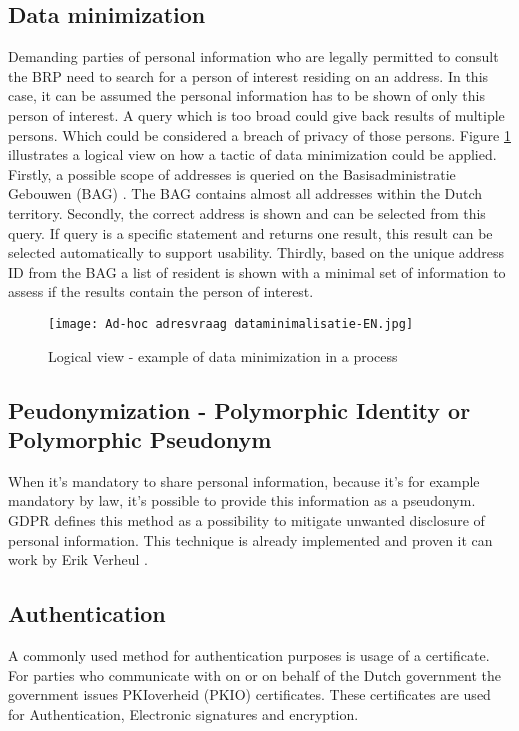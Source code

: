 \subsection{Data minimization}
Demanding parties of personal information who are legally permitted to consult the BRP need to search for a person of interest residing on an address. In this case, it can be assumed the personal information has to be shown of only this person of interest. A query which is too broad could give back results of multiple persons. Which could be considered a breach of privacy of those persons. Figure \ref{fig:Adhoc} illustrates a logical view on how a tactic of data minimization could be applied. Firstly, a possible scope of addresses is queried on the Basisadministratie Gebouwen (BAG) \cite{BAG}. The BAG contains almost all addresses within the Dutch territory. Secondly, the correct address is shown and can be selected from this query. If query is a specific statement and returns one result, this result can be selected automatically to support usability. Thirdly, based on the unique address ID from the BAG a list of resident is shown with a minimal set of information to assess if the results contain the person of interest.    
\graphicspath{ {./images/} }
\begin{figure}
\centering
\label{fig:Adhoc}
\texttt{[image: Ad-hoc adresvraag dataminimalisatie-EN.jpg]}\\
\caption{Logical view - example of data minimization in a process}
\end{figure}

\subsection{Peudonymization - Polymorphic Identity or Polymorphic Pseudonym}
When it's mandatory to share personal information, because it's for example mandatory by law, it's possible to provide this information as a pseudonym. GDPR \cite{GDPR} defines this method as a possibility to mitigate unwanted disclosure of personal information. 
This technique is already implemented and proven it can work by Erik Verheul \cite{VerheuleID}.

\subsection{Authentication}
A commonly used method for authentication purposes is usage of a certificate. For parties who communicate with on or on behalf of the Dutch government the government issues PKIoverheid (PKIO) certificates. These certificates are used for Authentication, Electronic signatures and encryption. \cite{Logius_PKIO}

